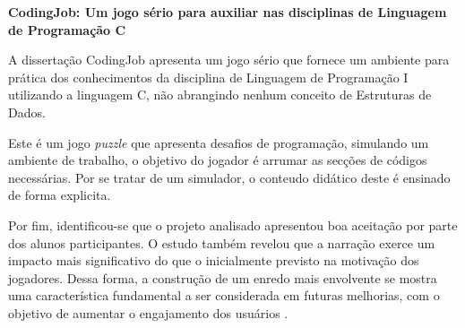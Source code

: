 \item \textbf{CodingJob: Um jogo sério para auxiliar nas disciplinas de Linguagem de Programação C}

A dissertação CodingJob \cite{costa2023condigjob} apresenta um jogo
sério que fornece um ambiente para prática dos conhecimentos da disciplina de
Linguagem de Programação I utilizando a linguagem C, não abrangindo nenhum
conceito de Estruturas de Dados.

Este é um jogo \emph{puzzle} que apresenta desafios de programação, simulando
um ambiente de trabalho, o objetivo do jogador é arrumar as secções de códigos
necessárias. Por se tratar de um simulador, o conteudo didático deste é
ensinado de forma explicita.

Por fim, identificou-se que o projeto analisado apresentou boa aceitação por
parte dos alunos participantes. O estudo também revelou que a narração exerce
um impacto mais significativo do que o inicialmente previsto na motivação dos
jogadores. Dessa forma, a construção de um enredo mais envolvente se mostra uma
característica fundamental a ser considerada em futuras melhorias, com o
objetivo de aumentar o engajamento dos usuários \cite{costa2023condigjob}.


